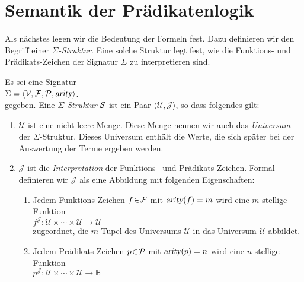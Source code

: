 \section{Semantik der Pr\"{a}dikatenlogik}
Als n\"{a}chstes legen wir die Bedeutung der Formeln fest.  Dazu definieren wir 
den Begriff einer \emph{$\Sigma$-Struktur}.  Eine solche Struktur legt fest, wie die
Funktions- und Pr\"{a}dikats-Zeichen der Signatur $\Sigma$ zu interpretieren sind.

\begin{Definition}[Struktur]
    Es sei eine  Signatur \\[0.2cm]
    \hspace*{1.3cm} $\Sigma = \langle \mathcal{V}, \mathcal{F}, \mathcal{P}, \textsl{arity} \rangle$. \\[0.2cm]
    gegeben. Eine \emph{$\Sigma$-Struktur} $\mathcal{S}$ ist ein
    Paar $\langle \mathcal{U}, \mathcal{J} \rangle$, so dass folgendes gilt:
    \begin{enumerate}
        \item $\mathcal{U}$ ist eine nicht-leere Menge. Diese Menge nennen wir auch das
              \emph{Universum} der $\Sigma$-Struktur.  Dieses Universum enth\"{a}lt die Werte,
              die sich sp\"{a}ter bei der Auswertung der Terme ergeben werden.
        \item $\mathcal{J}$ ist die \emph{Interpretation} der Funktions-- und Pr\"{a}dikats-Zeichen.
              Formal definieren wir $\mathcal{J}$ als eine Abbildung mit folgenden Eigenschaften:
        \begin{enumerate}
        \item Jedem Funktions-Zeichen $f \!\in\! \mathcal{F}$ mit $\textsl{arity}(f) = m$ wird
              eine $m$-stellige Funktion \\[0.2cm]
              \hspace*{1.3cm}
              $f^\mathcal{J}\colon \mathcal{U} \times \cdots \times \mathcal{U} \rightarrow \mathcal{U}$ \\[0.2cm]
              zugeordnet, die $m$-Tupel des Universums $\mathcal{U}$ in das Universum $\mathcal{U}$ abbildet.
        \item Jedem Pr\"{a}dikats-Zeichen $p \!\in\! \mathcal{P}$ mit $\textsl{arity}(p) = n$ wird
              eine $n$-stellige Funktion \\[0.2cm]
              \hspace*{1.3cm} 
              $p^\mathcal{J}\colon \mathcal{U} \times \cdots \times \mathcal{U} \rightarrow \mathbb{B}$ \\[0.2cm]

\end{enumerate}
\end{enumerate}
\end{Definition}
